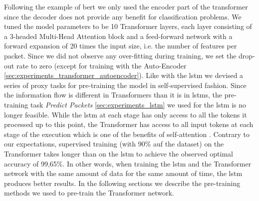 Following the example of \gls{bert} we only used the encoder part of the transformer since the decoder does not provide any benefit for classification problems. We tuned the model parameters to be 10 Transformer layers, each layer consisting of a 3-headed Multi-Head Attention block and a feed-forward network with a forward expansion of 20 times the input size, i.e. the number of features per packet. Since we did not observe any over-fitting during training, we set the drop-out rate to zero (except for training with the Auto-Encoder \ref{sec:experiments_transformer_autoencoder}). 
Like with the \gls{lstm} we devised a series of proxy tasks for pre-training the model in self-supervised fashion. Since the information flow is different in Transformers than it is in \glspl{lstm}, the pre-training task \textit{Predict Packets} \ref{sec:experiments_lstm} we used for the \gls{lstm} is no longer feasible. While the \gls{lstm} at each stage has only access to all the tokens it processed up to this point, the Transformer has access to all input tokens at each stage of the execution which is one of the benefits of self-attention \cite{attention}. Contrary to our expectations, supervised training (with 90\% auf the dataset) on the Transformer takes longer than on the \gls{lstm} to achieve the observed optimal accuracy of 99,65\%. In other words, when training the \gls{lstm} and the Transformer network with the same amount of data for the same amount of time, the \gls{lstm} produces better results. In the following sections we describe the pre-training methods we used to pre-train the Transformer network.

